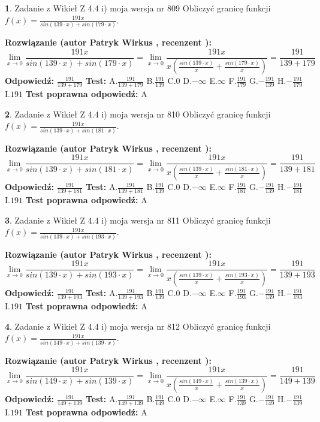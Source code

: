 \documentclass[12pt, a4paper]{article}
\theoremstyle{definition} %
\newtheorem{zad}{}
\newcommand{\zadStart}[1]{\begin{zad}#1\newline}
\newcommand{\zadStop}{\end{zad}}
\newcommand{\rozwStart}[2]{\noindent \textbf{Rozwiązanie (autor #1 , recenzent #2): }\newline}
\newcommand{\rozwStop}{\newline}
\newcommand{\odpStart}{\noindent \textbf{Odpowiedź:}\newline}
\newcommand{\odpStop}{\newline}
\newcommand{\testStart}{\noindent \textbf{Test:}\newline}
\newcommand{\testStop}{\newline}
\newcommand{\kluczStart}{\noindent \textbf{Test poprawna odpowiedź:}\newline}
\newcommand{\kluczStop}{\newline}
\begin{document}
\zadStart{Zadanie z Wikieł Z 4.4 i) moja wersja nr 809}
Obliczyć granicę funkcji $f(x)=\frac{191x}{sin(139\cdot x) +sin(179\cdot x)}$.
\zadStop
\rozwStart{Patryk Wirkus}{}
$$\lim\limits_{x\to 0}\frac{191x}{sin(139\cdot x) +sin(179\cdot x)}=\lim\limits_{x\to 0}\frac{191x}{x(\frac{sin(139\cdot x)}{x}+\frac{sin(179\cdot x)}{x})}=\frac{191}{139+179}$$
\rozwStop
\odpStart
$\frac{191}{139+179}$
\odpStop
\testStart
A.$\frac{191}{139+179}$
B.$\frac{191}{139}$
C.$0$
D.$-\infty$
E.$\infty$
F.$\frac{191}{179}$
G.$-\frac{191}{139}$
H.$-\frac{191}{179}$
I.$191$
\testStop
\kluczStart
A
\kluczStop



\zadStart{Zadanie z Wikieł Z 4.4 i) moja wersja nr 810}
Obliczyć granicę funkcji $f(x)=\frac{191x}{sin(139\cdot x) +sin(181\cdot x)}$.
\zadStop
\rozwStart{Patryk Wirkus}{}
$$\lim\limits_{x\to 0}\frac{191x}{sin(139\cdot x) +sin(181\cdot x)}=\lim\limits_{x\to 0}\frac{191x}{x(\frac{sin(139\cdot x)}{x}+\frac{sin(181\cdot x)}{x})}=\frac{191}{139+181}$$
\rozwStop
\odpStart
$\frac{191}{139+181}$
\odpStop
\testStart
A.$\frac{191}{139+181}$
B.$\frac{191}{139}$
C.$0$
D.$-\infty$
E.$\infty$
F.$\frac{191}{181}$
G.$-\frac{191}{139}$
H.$-\frac{191}{181}$
I.$191$
\testStop
\kluczStart
A
\kluczStop



\zadStart{Zadanie z Wikieł Z 4.4 i) moja wersja nr 811}
Obliczyć granicę funkcji $f(x)=\frac{191x}{sin(139\cdot x) +sin(193\cdot x)}$.
\zadStop
\rozwStart{Patryk Wirkus}{}
$$\lim\limits_{x\to 0}\frac{191x}{sin(139\cdot x) +sin(193\cdot x)}=\lim\limits_{x\to 0}\frac{191x}{x(\frac{sin(139\cdot x)}{x}+\frac{sin(193\cdot x)}{x})}=\frac{191}{139+193}$$
\rozwStop
\odpStart
$\frac{191}{139+193}$
\odpStop
\testStart
A.$\frac{191}{139+193}$
B.$\frac{191}{139}$
C.$0$
D.$-\infty$
E.$\infty$
F.$\frac{191}{193}$
G.$-\frac{191}{139}$
H.$-\frac{191}{193}$
I.$191$
\testStop
\kluczStart
A
\kluczStop



\zadStart{Zadanie z Wikieł Z 4.4 i) moja wersja nr 812}
Obliczyć granicę funkcji $f(x)=\frac{191x}{sin(149\cdot x) +sin(139\cdot x)}$.
\zadStop
\rozwStart{Patryk Wirkus}{}
$$\lim\limits_{x\to 0}\frac{191x}{sin(149\cdot x) +sin(139\cdot x)}=\lim\limits_{x\to 0}\frac{191x}{x(\frac{sin(149\cdot x)}{x}+\frac{sin(139\cdot x)}{x})}=\frac{191}{149+139}$$
\rozwStop
\odpStart
$\frac{191}{149+139}$
\odpStop
\testStart
A.$\frac{191}{149+139}$
B.$\frac{191}{149}$
C.$0$
D.$-\infty$
E.$\infty$
F.$\frac{191}{139}$
G.$-\frac{191}{149}$
H.$-\frac{191}{139}$
I.$191$
\testStop
\kluczStart
A
\kluczStop
\end{document}

